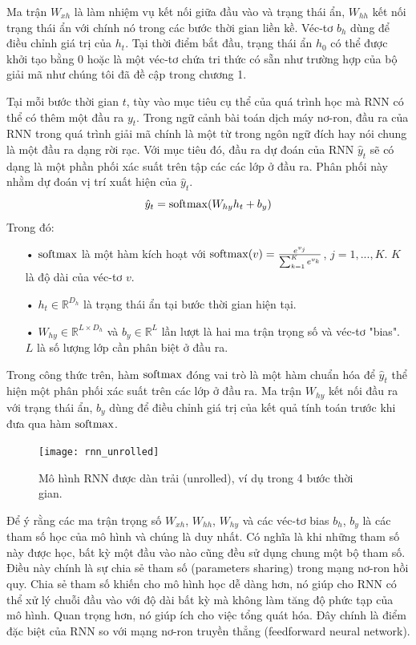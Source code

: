 Ma trận $W_{xh}$ là làm nhiệm vụ kết nối giữa đầu vào và trạng thái ẩn, $W_{hh}$ kết nối trạng thái ẩn với chính nó trong các bước thời gian liền kề. Véc-tơ $b_h$ dùng để điều chỉnh giá trị của $h_t$. Tại thời điểm bắt đầu, trạng thái ẩn $h_0$ có thể được khởi tạo bằng 0 hoặc là một véc-tơ chứa tri thức có sẵn như trường hợp của bộ giải mã như chúng tôi đã đề cập trong chương 1.

Tại mỗi bước thời gian $t$, tùy vào mục tiêu cụ thể của quá trình học mà RNN có thể có thêm một đầu ra $y_t$. Trong ngữ cảnh bài toán dịch máy nơ-ron, đầu ra của RNN trong quá trình giải mã chính là một từ trong ngôn ngữ đích hay nói chung là một đầu ra dạng rời rạc. Với mục tiêu đó, đầu ra dự đoán của RNN $\hat{y}_t$ sẽ có dạng là một phần phối xác suất trên tập các các lớp ở đầu ra. Phân phối này nhằm dự đoán vị trí xuất hiện của $\hat{y}_t$.
\begin{equation} \label{rnnOuputSoftmaxDistribution}
\hat{y}_t = \mathrm{softmax}(W_{hy}h_t + b_y)
\end{equation}
Trong đó:
\begin{itemize}
	\item[•] $\mathrm{softmax}$ là một hàm kích hoạt với $\mathrm{softmax}(v) = \frac{e^{v_j}}{\sum_{k=1}^{K}e^{v_k}}$, $j = 1,...,K$. $K$ là độ dài của véc-tơ $v$.
	\item[•] $h_{t} \in \mathbb{R}^{D_h}$ là trạng thái ẩn tại bước thời gian hiện tại.
	\item[•] $W_{hy} \in \mathbb{R}^{L \times D_h}$ và $b_y \in \mathbb{R}^L$ lần lượt là hai ma trận trọng số và véc-tơ "bias". $L$ là số lượng lớp cần phân biệt ở đầu ra.
\end{itemize}

Trong công thức trên, hàm $\mathrm{softmax}$ đóng vai trò là một hàm chuẩn hóa để $\hat{y}_t$ thể hiện một phân phối xác suất trên các lớp ở đầu ra. Ma trận $W_{hy}$ kết nối đầu ra với trạng thái ẩn, $b_y$ dùng để điều chỉnh giá trị của kết quả tính toán trước khi đưa qua hàm $\mathrm{softmax}$.

\begin{figure}
	\centering
	\texttt{[image: rnn\_unrolled]}
	\caption[Mô hình RNN dạng dàn trải]{Mô hình RNN được dàn trải (unrolled), ví dụ trong 4 bước thời gian.}
	\label{fig_rnn_unrolled}
\end{figure}

Để ý rằng các ma trận trọng số $W_{xh}$, $W_{hh}$, $W_{hy}$ và các véc-tơ bias $b_h$, $b_y$ là các tham số học của mô hình và chúng là duy nhất. Có nghĩa là khi những tham số này được học, bất kỳ một đầu vào nào cũng đều sử dụng chung một bộ tham số. Điều này chính là sự chia sẻ tham số (parameters sharing) trong mạng nơ-ron hồi quy. Chia sẻ tham số khiến cho mô hình học dễ dàng hơn, nó giúp cho RNN có thể xử lý chuỗi đầu vào với độ dài bất kỳ mà không làm tăng độ phức tạp của mô hình. Quan trọng hơn, nó giúp ích cho việc tổng quát hóa. Đây chính là điểm đặc biệt của RNN so với mạng nơ-ron truyền thẳng (feedforward neural network).

